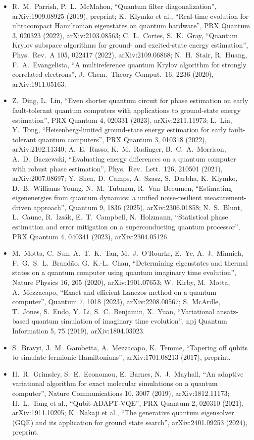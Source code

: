 \documentclass[11pt,a4paper]{article}
\begin{document}
\begin{itemize}
\item R.~M.~Parrish, P.~L.~McMahon, ``Quantum filter diagonalization'', arXiv:1909.08925 (2019), preprint; K.~Klymko et al., ``Real-time evolution for ultracompact Hamiltonian eigenstates on quantum hardware'', PRX Quantum 3, 020323 (2022), arXiv:2103.08563; C.~L.~Cortes, S.~K.~Gray, ``Quantum Krylov subspace algorithms for ground- and excited-state energy estimation'', Phys.\ Rev.\ A 105, 022417 (2022), arXiv:2109.06868; N.~H.~Stair, R.~Huang, F.~A.~Evangelista, ``A multireference quantum Krylov algorithm for strongly correlated electrons'', J.\ Chem.\ Theory Comput.\ 16, 2236 (2020), arXiv:1911.05163.
\item Z.~Ding, L.~Lin, ``Even shorter quantum circuit for phase estimation on early fault-tolerant quantum computers with applications to ground-state energy estimation'', PRX Quantum 4, 020331 (2023), arXiv:2211.11973; L.~Lin, Y.~Tong, ``Heisenberg-limited ground-state energy estimation for early fault-tolerant quantum computers'', PRX Quantum 3, 010318 (2022), arXiv:2102.11340; A.~E.~Russo, K.~M.~Rudinger, B.~C.~A.~Morrison, A.~D.~Baczewski, ``Evaluating energy differences on a quantum computer with robust phase estimation'', Phys.\ Rev.\ Lett.\ 126, 210501 (2021), arXiv:2007.08697; Y.~Shen, D.~Camps, A.~Szasz, S.~Darbha, K.~Klymko, D.~B.~Williams-Young, N.~M.~Tubman, R.~Van~Beeumen, ``Estimating eigenenergies from quantum dynamics: a unified noise-resilient measurement-driven approach'', Quantum 9, 1836 (2025), arXiv:2306.01858; N.~S.~Blunt, L.~Caune, R.~Izs\'ak, E.~T.~Campbell, N.~Holzmann, ``Statistical phase estimation and error mitigation on a superconducting quantum processor'', PRX Quantum 4, 040341 (2023), arXiv:2304.05126.
\item M.~Motta, C.~Sun, A.~T.~K.~Tan, M.~J.~O'Rourke, E.~Ye, A.~J.~Minnich, F.~G.~S.~L.~Brand\~ao, G.~K.-L.~Chan, ``Determining eigenstates and thermal states on a quantum computer using quantum imaginary time evolution'', Nature Physics 16, 205 (2020), arXiv:1901.07653; W.~Kirby, M.~Motta, A.~Mezzacapo, ``Exact and efficient Lanczos method on a quantum computer'', Quantum 7, 1018 (2023), arXiv:2208.00567; S.~McArdle, T.~Jones, S.~Endo, Y.~Li, S.~C.~Benjamin, X.~Yuan, ``Variational ansatz-based quantum simulation of imaginary time evolution'', npj Quantum Information 5, 75 (2019), arXiv:1804.03023.
\item S.~Bravyi, J.~M.~Gambetta, A.~Mezzacapo, K.~Temme, ``Tapering off qubits to simulate fermionic Hamiltonians'', arXiv:1701.08213 (2017), preprint.
\item H.~R.~Grimsley, S.~E.~Economou, E.~Barnes, N.~J.~Mayhall, ``An adaptive variational algorithm for exact molecular simulations on a quantum computer'', Nature Communications 10, 3007 (2019), arXiv:1812.11173; H.~L.~Tang et al., ``Qubit-ADAPT-VQE'', PRX Quantum 2, 020310 (2021), arXiv:1911.10205; K.~Nakaji et al., ``The generative quantum eigensolver (GQE) and its application for ground state search'', arXiv:2401.09253 (2024), preprint.

\end{itemize}
\end{document}
